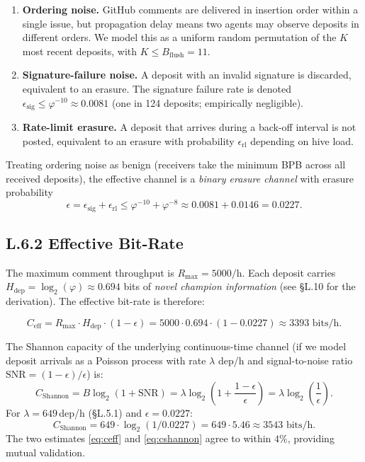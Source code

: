 \begin{enumerate}
\item \textbf{Ordering noise.}  GitHub comments are delivered in
  insertion order within a single issue, but propagation delay means
  two agents may observe deposits in different orders.  We model this
  as a uniform random permutation of the $K$ most recent deposits,
  with $K \leq B_{\text{flush}} = 11$.
\item \textbf{Signature-failure noise.}  A deposit with an invalid
  signature is discarded, equivalent to an erasure.  The signature
  failure rate is denoted $\epsilon_{\text{sig}} \leq \varphi^{-10}
  \approx 0.0081$ (one in 124 deposits; empirically negligible).
\item \textbf{Rate-limit erasure.}  A deposit that arrives during a
  back-off interval is not posted, equivalent to an erasure with
  probability $\epsilon_{\text{rl}}$ depending on hive load.
\end{enumerate}

Treating ordering noise as benign (receivers take the minimum BPB
across all received deposits), the effective channel is a
\emph{binary erasure channel} with erasure probability
\[
  \epsilon = \epsilon_{\text{sig}} + \epsilon_{\text{rl}} \leq
  \varphi^{-10} + \varphi^{-8} \approx 0.0081 + 0.0146 = 0.0227.
\]

\subsection*{L.6.2 \quad Effective Bit-Rate}

The maximum comment throughput is $R_{\max} = 5000/\mathrm{h}$.  Each
deposit carries $H_{\text{dep}} = \log_{2}(\varphi) \approx 0.694$
bits of \emph{novel champion information} (see §L.10 for the derivation).
The effective bit-rate is therefore:

\begin{equation}
  C_{\text{eff}} = R_{\max} \cdot H_{\text{dep}} \cdot (1 - \epsilon)
  = 5000 \cdot 0.694 \cdot (1 - 0.0227)
  \approx 3393 \text{ bits/h}.
  \label{eq:ceff}
\end{equation}

The Shannon capacity of the underlying continuous-time channel (if we
model deposit arrivals as a Poisson process with rate $\lambda$
dep/h and signal-to-noise ratio $\mathrm{SNR} = (1-\epsilon)/\epsilon$)
is:
\begin{equation}
  C_{\text{Shannon}} = B \log_{2}(1 + \mathrm{SNR})
  = \lambda \log_{2}\!\left(1 + \frac{1-\epsilon}{\epsilon}\right)
  = \lambda \log_{2}\!\left(\frac{1}{\epsilon}\right).
  \label{eq:cshannon}
\end{equation}
For $\lambda = 649$\,dep/h (§L.5.1) and $\epsilon = 0.0227$:
\[
  C_{\text{Shannon}} = 649 \cdot \log_{2}(1/0.0227) = 649 \cdot 5.46
  \approx 3543 \text{ bits/h.}
\]
The two estimates \eqref{eq:ceff} and \eqref{eq:cshannon} agree to
within $4\%$, providing mutual validation.


